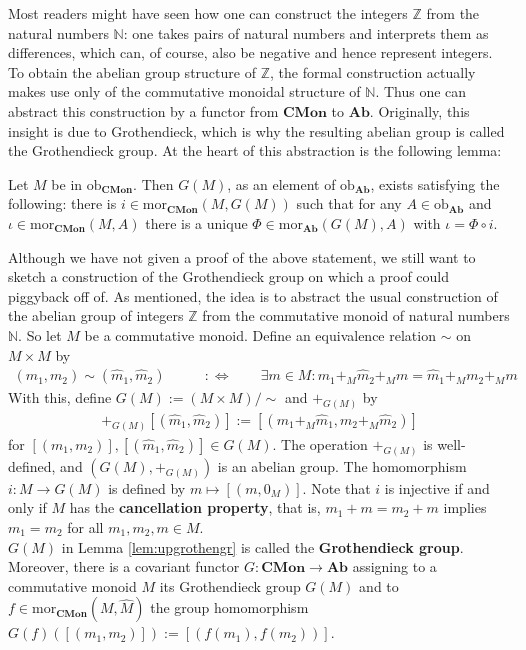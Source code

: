 \nocite{7fc005ba}
\nocite{a3f326d1}
Most readers might have seen how one can construct the integers $\mathbb{Z}$ from the natural numbers $\mathbb{N}$: one takes pairs of natural numbers and interprets them as differences, which can, of course, also be negative and hence represent integers.
To obtain the abelian group structure of $\mathbb{Z}$, the formal construction actually makes use only of the commutative monoidal structure of $\mathbb{N}$.
Thus one can abstract this construction by a functor from $\mathbf{CMon}$ to $\mathbf{Ab}$.
Originally, this insight is due to Grothendieck, which is why the resulting abelian group is called the Grothendieck group.
At the heart of this abstraction is the following lemma:
\\
\begin{lem}
\label{lem:upgrothengr}
Let $M$ be in $\mathrm{ob}_{\mathbf{CMon}}$.
Then $G(M)$, as an element of $\mathrm{ob}_{\mathbf{Ab}}$, exists satisfying the following: there is $i \in \mathrm{mor}_{\mathbf{CMon}}(M,G(M))$ such that for any $A \in \mathrm{ob}_{\mathbf{Ab}}$ and $\iota \in \mathrm{mor}_{\mathbf{CMon}}(M,A)$ there is a unique $\Phi \in \mathrm{mor}_{\mathbf{Ab}}(G(M),A)$ with $\iota = \Phi \circ i$.
\end{lem}
Although we have not given a proof of the above statement, we still want to sketch a construction of the Grothendieck group on which a proof could piggyback off of.
As mentioned, the idea is to abstract the usual construction of the abelian group of integers $\mathbb{Z}$ from the commutative monoid of natural numbers $\mathbb{N}$.
So let $M$ be a commutative monoid.
Define an equivalence relation $\sim$ on $M \times M$ by
\begin{align*}
  (m_{1},m_{2})
  \sim
  (\hat{m}_{1},\hat{m}_{2})
  \qquad
  &:\Leftrightarrow
  \qquad
  \exists
  m
  \in
  M
  \colon
  m_{1}
  +_{M}
  \hat{m}_{2}
  +_{M}
  m
  =
  \hat{m}_{1}
  +_{M}
  m_{2}
  +_{M}
  m
\end{align*}
With this, define $G(M) := (M \times M)/\sim$ and $+_{G(M)}$ by
\begin{align*}
  [(m_{1},m_{2})]
  +_{G(M)}
  [(\hat{m}_{1},\hat{m}_{2})]
  :=
  [(m_{1} +_{M} \hat{m}_{1},m_{2} +_{M} \hat{m}_{2})]
\end{align*}
for $[(m_{1},m_{2})],[(\hat{m}_{1},\hat{m}_{2})] \in G(M)$.
The operation $+_{G(M)}$ is well-defined, and $(G(M),+_{G(M)})$ is an abelian group.
The homomorphism $i \colon M \to G(M)$ is defined by $m \mapsto [(m,0_{M})]$.
Note that $i$ is injective if and only if $M$ has the \textbf{cancellation property}, that is, $m_{1} + m = m_{2} + m$ implies $m_{1} = m_{2}$ for all $m_{1},m_{2},m \in M$.
\\
$G(M)$ in Lemma \ref{lem:upgrothengr} is called the \textbf{Grothendieck group}.
Moreover, there is a covariant functor $G \colon \mathbf{CMon} \to \mathbf{Ab}$ assigning to a commutative monoid $M$ its Grothendieck group $G(M)$ and to $f \in \mathrm{mor}_{\mathbf{CMon}}(M,\hat{M})$ the group homomorphism $G(f)([(m_{1},m_{2})]) := [(f(m_{1}),f(m_{2}))]$.
